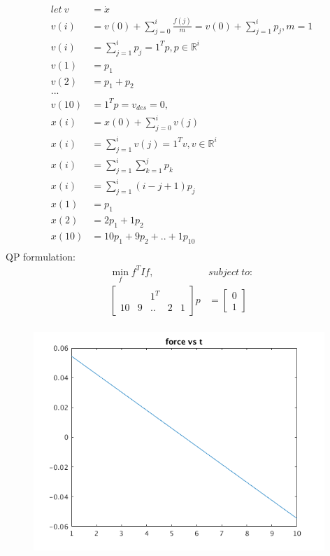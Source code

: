 \documentclass[12pt,letter]{article}
\newcommand{\R}{\mathbb{R}}
\begin{document}
\begin{enumerate}
\begin{itemize}
    \begin{align*}
      let\ v &= \dot{x}\\ 
      v(i) &= v(0) + \sum_{j=0}^i \frac{f(j)}{m} = v(0) + \sum_{j=1}^i p_j, m=1\\
      v(i) &= \sum_{j=1}^i p_j = 1^T p, p \in \R^{i}\\
      v(1) &= p_1\\
      v(2) &= p_1 + p_2\\
      ...\\
      v(10) &= 1^T p = v_{des} = 0,\\
      x(i) &= x(0) + \sum_{j=0}^i v(j)\\
      x(i) &= \sum_{j=1}^i v(j) = 1^T v, v \in \R^{i}\\
      x(i) &= \sum_{j=1}^i \sum_{k=1}^j p_k\\
      x(i) &= \sum_{j=1}^i (i-j+1) p_j\\
      x(1) &= p_1\\
      x(2) &= 2 p_1 + 1p_2\\
      x(10) &= 10 p_1 + 9p_2 + .. + 1p_{10}\\
    \end{align*}
    QP formulation:
    \begin{align*}
      \min_{f} f^TIf,\ &subject\ to:\\
      \begin{bmatrix}
        & & 1^T & & \\
        10 & 9 & .. & 2 & 1
      \end{bmatrix} p &=
      \begin{bmatrix}
        0\\
        1
      \end{bmatrix}\\
    \end{align*}
    \begin{figure}[H]
      \centering
      \includegraphics[width=11cm]{q9/part_a_plot_1.png}

\end{figure}
\end{itemize}
\end{enumerate}
\end{document}
